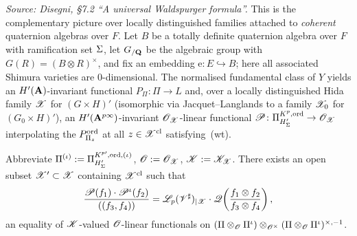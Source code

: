 \begin{theorem}
  \label{thm:WaldspurgerUniversal}
%
  \textit{Source: Disegni, §7.2 ``A universal Waldspurger formula''.}
  This is the complementary picture over locally distinguished families
  attached to \emph{coherent} quaternion algebras over $F$.  Let $B$ be
  a totally definite quaternion algebra over $F$ with ramification set
  $\Sigma$, let $G_{/\mathbf{Q}}$ be the algebraic group with
  $G(R) = (B \otimes R)^\times$, and fix an embedding
  $\mathrm{e} \colon E \hookrightarrow B$; here all associated Shimura
  varieties are $0$-dimensional.  The normalised fundamental class of
  $Y$ yields an $H'(\mathbf{A})$-invariant functional $P_\Pi \colon \Pi \to L$
  and, over a locally distinguished Hida family $\mathscr{X}$ for
  $(G \times H)'$ (isomorphic via Jacquet--Langlands to a family $\mathscr{X}_0$
  for $(G_0 \times H)'$), an $H'(\mathbf{A}^{p\infty})$-invariant
  $\mathscr{O}_{\mathscr{X}}$-linear functional
  $\mathscr{P} \colon \Pi^{K^p,\mathrm{ord}}_{H'_\Sigma} \to \mathscr{O}_{\mathscr{X}}$ interpolating the
  $P^{\mathrm{ord}}_{\Pi_z}$ at all $z \in \mathscr{X}^{\mathrm{cl}}$ satisfying~(wt).

  Abbreviate $\Pi^{(\iota)} := \Pi^{K^{p\prime},\mathrm{ord},(\iota)}_{H'_\Sigma}$,
  $\mathscr{O} := \mathscr{O}_{\mathscr{X}}$, $\mathscr{K} := \mathscr{K}_{\mathscr{X}}$.  There exists an open subset
  $\mathscr{X}' \subset \mathscr{X}$ containing $\mathscr{X}^{\mathrm{cl}}$ such that
  \[
    \frac{\mathscr{P}(f_1) \cdot \mathscr{P}^\iota(f_2)}{((f_3, f_4))}
    =
    \mathscr{L}_p(\mathscr{V}^\sharp)_{|\mathscr{X}}
    \cdot
    \mathscr{Q}\!\left(\frac{f_1 \otimes f_2}{f_3 \otimes f_4}\right),
  \]
  an equality of $\mathscr{K}$-valued $\mathscr{O}$-linear functionals on
  $(\Pi \otimes_{\mathscr{O}} \Pi^\iota) \otimes_{\mathscr{O}^\times}
  (\Pi \otimes_{\mathscr{O}} \Pi^\iota)^{\times,-1}$.
\end{theorem}

